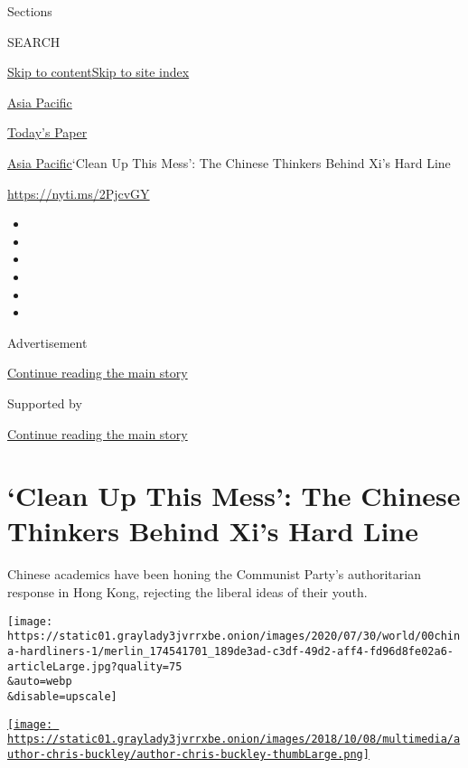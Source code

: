 Sections

SEARCH

\protect\hyperlink{site-content}{Skip to
content}\protect\hyperlink{site-index}{Skip to site index}

\href{https://www.nytimes3xbfgragh.onion/section/world/asia}{Asia
Pacific}

\href{https://myaccount.nytimes3xbfgragh.onion/auth/login?response_type=cookie\&client_id=vi}{}

\href{https://www.nytimes3xbfgragh.onion/section/todayspaper}{Today's
Paper}

\href{/section/world/asia}{Asia Pacific}\textbar{}`Clean Up This Mess':
The Chinese Thinkers Behind Xi's Hard Line

\url{https://nyti.ms/2PjcvGY}

\begin{itemize}
\item
\item
\item
\item
\item
\item
\end{itemize}

Advertisement

\protect\hyperlink{after-top}{Continue reading the main story}

Supported by

\protect\hyperlink{after-sponsor}{Continue reading the main story}

\hypertarget{clean-up-this-mess-the-chinese-thinkers-behind-xis-hard-line}{%
\section{`Clean Up This Mess': The Chinese Thinkers Behind Xi's Hard
Line}\label{clean-up-this-mess-the-chinese-thinkers-behind-xis-hard-line}}

Chinese academics have been honing the Communist Party's authoritarian
response in Hong Kong, rejecting the liberal ideas of their youth.

\texttt{[image: https://static01.graylady3jvrrxbe.onion/images/2020/07/30/world/00china-hardliners-1/merlin\_174541701\_189de3ad-c3df-49d2-aff4-fd96d8fe02a6-articleLarge.jpg?quality=75\\\&auto=webp\\\&disable=upscale]}

\href{https://www.nytimes3xbfgragh.onion/by/chris-buckley}{\texttt{[image: https://static01.graylady3jvrrxbe.onion/images/2018/10/08/multimedia/author-chris-buckley/author-chris-buckley-thumbLarge.png]}}

